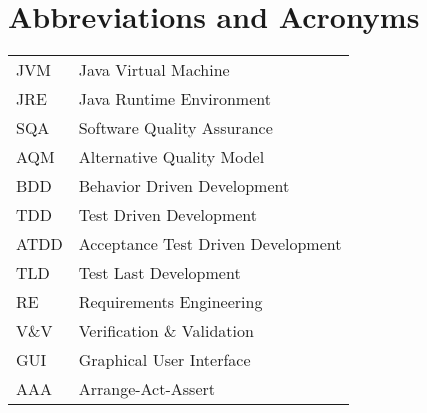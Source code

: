 \chapter*{Abbreviations and Acronyms}


\noindent
\begin{longtable}{@{}p{}p{}@{}}
JVM & Java Virtual Machine \\
JRE & Java Runtime Environment \\
SQA & Software Quality Assurance \\
AQM & Alternative Quality Model \\
BDD & Behavior Driven Development \\
TDD & Test Driven Development \\
ATDD & Acceptance Test Driven Development \\
TLD & Test Last Development \\
RE & Requirements Engineering \\
V\&V & Verification \& Validation \\
GUI & Graphical User Interface \\
AAA & Arrange-Act-Assert \\
\end{longtable}
